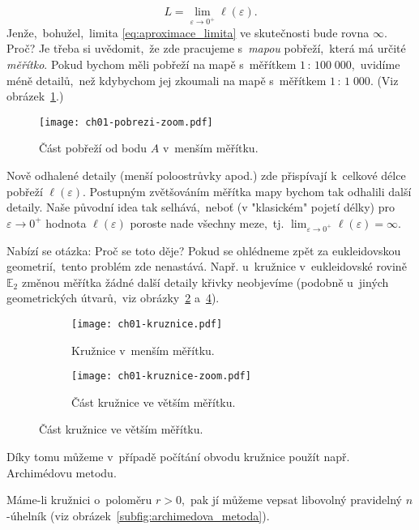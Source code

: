 \begin{equation}\label{eq:aproximace_limita}
    L=\lim_{\varepsilon\to0^+}{\ell(\varepsilon)}.
\end{equation}
Jenže,~bohužel,~limita \eqref{eq:aproximace_limita} ve skutečnosti bude rovna $\infty$. Proč? Je třeba si uvědomit,~že zde pracujeme s~\emph{mapou} pobřeží,~která má určité \emph{měřítko}. Pokud bychom měli pobřeží na mapě s~měřítkem $1\,:\,100\;000$,~uvidíme méně detailů,~než kdybychom jej zkoumali na mapě s~měřítkem $1\,:\,1\;000$. (Viz obrázek~\ref{fig:pobrezi_zoom}.)\par
\begin{figure}[h]
    \centering
    \texttt{[image: ch01-pobrezi-zoom.pdf]}
    \caption{Část pobřeží od bodu $A$ v~menším měřítku.}
    \label{fig:pobrezi_zoom}
\end{figure}
Nově odhalené detaily (menší poloostrůvky apod.) zde přispívají k~celkové délce pobřeží $\ell(\varepsilon)$. Postupným zvětšováním měřítka mapy bychom tak odhalili další detaily. Naše původní idea tak selhává,~neboť (v "klasickém" pojetí délky) pro $\varepsilon\to0^+$ hodnota $\ell(\varepsilon)$ poroste nade všechny meze,~tj. $\lim_{\varepsilon\to0^+}{\ell(\varepsilon)}=\infty$.\par
Nabízí se otázka: Proč se toto děje? Pokud se ohlédneme zpět za eukleidovskou geometrií,~tento problém zde nenastává. Např. u~kružnice v~eukleidovské rovině $\mathbb{E}_2$ změnou měřítka žádné další detaily křivky neobjevíme (podobně u~jiných geometrických útvarů,~viz obrázky~\ref{subfig:kruznice} a~\ref{subfig:kruznice_zoom}). 
\begin{figure}[h]
    \centering
    \begin{subfigure}{\subfigwidth}
        \centering
        \texttt{[image: ch01-kruznice.pdf]}
        \caption{Kružnice v~menším měřítku.}
        \label{subfig:kruznice}
    \end{subfigure}
    \quad
    \begin{subfigure}{\subfigwidth}
        \centering
        \texttt{[image: ch01-kruznice-zoom.pdf]}
        \caption{Část kružnice ve větším měřítku.}
        \label{subfig:kruznice_zoom}
    \end{subfigure}
\end{figure}
Díky tomu můžeme v~případě počítání obvodu kružnice použít např. Archimédovu metodu.\par
Máme-li kružnici o~poloměru $r>0$,~pak jí můžeme vepsat libovolný pravidelný $n$-úhelník (viz obrázek~\ref{subfig:archimedova_metoda}).
